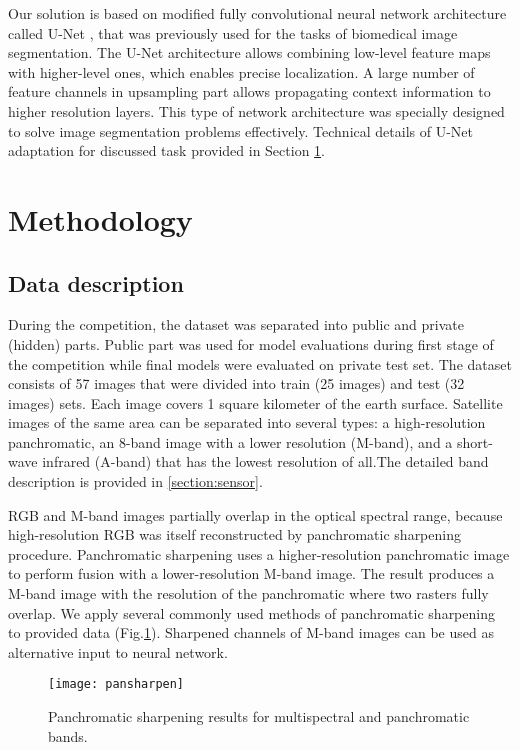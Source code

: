 \documentclass[10pt,twocolumn,letterpaper]{article}
\begin{document}
Our solution is based on modified fully convolutional neural network architecture called U-Net  \cite{unet}, that was previously used for the tasks of biomedical image segmentation. The U-Net architecture allows combining low-level feature maps with higher-level ones, which enables precise localization.  A large number of feature channels in upsampling part allows propagating context information to higher resolution layers.  This type of network architecture was specially designed to solve image segmentation problems effectively. Technical details of U-Net adaptation for discussed task provided in Section \ref{section:methods}.

\section{Methodology}
\label{section:methods}

\subsection{Data description}

During the competition, the dataset was separated into public and private (hidden) parts. Public part was used for model evaluations during first stage of the competition while final models were evaluated on private test set.
The dataset consists of 57 images that were divided into train (25 images) and test (32 images) sets. Each image covers 1 square kilometer of the earth surface. Satellite images of the same area can be separated into several types: a high-resolution panchromatic, an 8-band image with a lower resolution (M-band), and a short-wave infrared (A-band) that has the lowest resolution of all.The detailed band description is provided in \ref{section:sensor}.

RGB and M-band images partially overlap in the optical spectral range, because high-resolution RGB was itself reconstructed by panchromatic sharpening procedure. Panchromatic sharpening uses a higher-resolution panchromatic image to perform  fusion with a lower-resolution M-band image. The result produces a M-band image with the resolution of the panchromatic  where two rasters fully overlap. We apply several commonly used methods of panchromatic sharpening \cite{pansharp} to provided data (Fig.\ref{fig:pan}). Sharpened channels of M-band images can be used as alternative input to neural network.

\begin{figure}[!h]
	\captionsetup{justification=centering}
	\centering
	\texttt{[image: pansharpen]}
	\caption{Panchromatic sharpening results for multispectral and panchromatic bands.}
	\label{fig:pan}
\end{figure}
\end{document}
